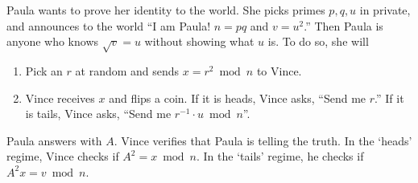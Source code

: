 \begin{example}
Paula wants to prove her identity to the world. She picks primes $p,q,u$ in private, and announces to the world ``I am Paula! $n=pq$ and $v=u^2$.'' Then Paula is anyone who knows $\sqrt{v} = u$ without showing what $u$ is. To do so, she will
\begin{enumerate}
\item Pick an $r$ at random and sends $x=r^2 \bmod n$ to Vince.
\item Vince receives $x$ and flips a coin. If it is heads, Vince asks, ``Send me $r$.'' If it is tails, Vince asks, ``Send me $r^{-1} \cdot u \bmod n$''.
\end{enumerate}
Paula answers with $A$. Vince verifies that Paula is telling the truth. In the `heads' regime, Vince checks if $A^2 = x \bmod n$. In the `tails' regime, he checks if $A^2x = v \bmod n$.
\end{example}